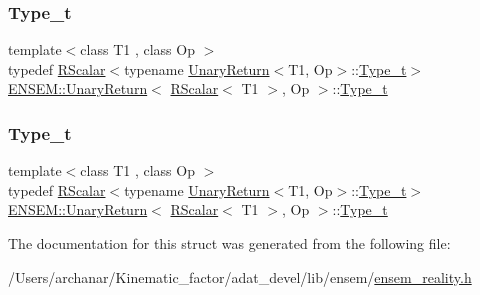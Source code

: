 \subsubsection{\texorpdfstring{Type\_t}{Type\_t}\hspace{0.1cm}{\footnotesize\ttfamily [1/2]}}
{\footnotesize\ttfamily template$<$class T1 , class Op $>$ \\
typedef \mbox{\hyperlink{classENSEM_1_1RScalar}{R\+Scalar}}$<$typename \mbox{\hyperlink{structENSEM_1_1UnaryReturn}{Unary\+Return}}$<$T1, Op$>$\+::\mbox{\hyperlink{structENSEM_1_1UnaryReturn_3_01RScalar_3_01T1_01_4_00_01Op_01_4_a406bd7c6dcdb1f1ee9e383de2e830d7c}{Type\+\_\+t}}$>$ \mbox{\hyperlink{structENSEM_1_1UnaryReturn}{E\+N\+S\+E\+M\+::\+Unary\+Return}}$<$ \mbox{\hyperlink{classENSEM_1_1RScalar}{R\+Scalar}}$<$ T1 $>$, Op $>$\+::\mbox{\hyperlink{structENSEM_1_1UnaryReturn_3_01RScalar_3_01T1_01_4_00_01Op_01_4_a406bd7c6dcdb1f1ee9e383de2e830d7c}{Type\+\_\+t}}}

\mbox{\label{structENSEM_1_1UnaryReturn_3_01RScalar_3_01T1_01_4_00_01Op_01_4_a406bd7c6dcdb1f1ee9e383de2e830d7c}} 
\subsubsection{\texorpdfstring{Type\_t}{Type\_t}\hspace{0.1cm}{\footnotesize\ttfamily [2/2]}}
{\footnotesize\ttfamily template$<$class T1 , class Op $>$ \\
typedef \mbox{\hyperlink{classENSEM_1_1RScalar}{R\+Scalar}}$<$typename \mbox{\hyperlink{structENSEM_1_1UnaryReturn}{Unary\+Return}}$<$T1, Op$>$\+::\mbox{\hyperlink{structENSEM_1_1UnaryReturn_3_01RScalar_3_01T1_01_4_00_01Op_01_4_a406bd7c6dcdb1f1ee9e383de2e830d7c}{Type\+\_\+t}}$>$ \mbox{\hyperlink{structENSEM_1_1UnaryReturn}{E\+N\+S\+E\+M\+::\+Unary\+Return}}$<$ \mbox{\hyperlink{classENSEM_1_1RScalar}{R\+Scalar}}$<$ T1 $>$, Op $>$\+::\mbox{\hyperlink{structENSEM_1_1UnaryReturn_3_01RScalar_3_01T1_01_4_00_01Op_01_4_a406bd7c6dcdb1f1ee9e383de2e830d7c}{Type\+\_\+t}}}



The documentation for this struct was generated from the following file\+:\begin{DoxyCompactItemize}
\item 
/\+Users/archanar/\+Kinematic\+\_\+factor/adat\+\_\+devel/lib/ensem/\mbox{\hyperlink{lib_2ensem_2ensem__reality_8h}{ensem\+\_\+reality.\+h}}\end{DoxyCompactItemize}
